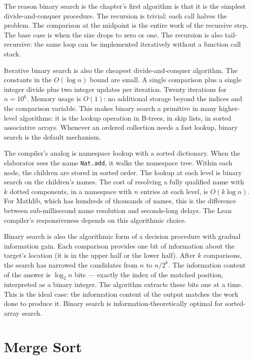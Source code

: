 The reason binary search is the chapter's first algorithm is that it is
the simplest divide-and-conquer procedure. The recursion is trivial: each
call halves the problem. The comparison at the midpoint is the entire
work of the recursive step. The base case is when the size drops to zero
or one. The recursion is also tail-recursive: the same loop can be
implemented iteratively without a function call stack.

Iterative binary search is also the cheapest divide-and-conquer
algorithm. The constants in the $O(\log n)$ bound are small. A single
comparison plus a single integer divide plus two integer updates per
iteration. Twenty iterations for $n = 10^6$. Memory usage is $O(1)$: no
additional storage beyond the indices and the comparison variable. This
makes binary search a primitive in many higher-level algorithms: it is
the lookup operation in B-trees, in skip lists, in sorted associative
arrays. Whenever an ordered collection needs a fast lookup, binary
search is the default mechanism.

The compiler's analog is namespace lookup with a sorted dictionary. When
the elaborator sees the name \texttt{Nat.add}, it walks the namespace
tree. Within each node, the children are stored in sorted order. The
lookup at each level is binary search on the children's names. The cost
of resolving a fully qualified name with $k$ dotted components, in a
namespace with $n$ entries at each level, is $O(k \log n)$. For Mathlib,
which has hundreds of thousands of names, this is the difference between
sub-millisecond name resolution and seconds-long delays. The Lean
compiler's responsiveness depends on this algorithmic choice.

Binary search is also the algorithmic form of a decision procedure with
gradual information gain. Each comparison provides one bit of information
about the target's location (it is in the upper half or the lower half).
After $k$ comparisons, the search has narrowed the candidates from $n$ to
$n / 2^k$. The information content of the answer is $\log_2 n$ bits ---
exactly the index of the matched position, interpreted as a binary
integer. The algorithm extracts these bits one at a time. This is the
ideal case: the information content of the output matches the work done
to produce it. Binary search is information-theoretically optimal for
sorted-array search.

\section{Merge Sort}
\label{se:merge-sort}


